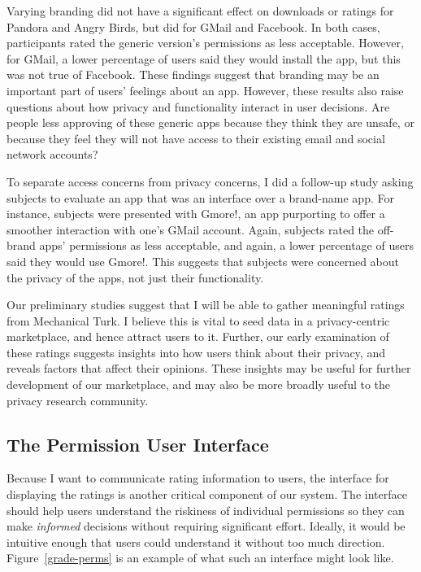 \documentclass[11pt]{article}
\newcommand{\reffig}[1]{Figure~\ref{#1}}
\begin{document}
Varying branding did not have a significant effect on downloads or
ratings for Pandora and Angry Birds, but did 
for GMail and Facebook. In both cases,
participants rated the generic version's permissions as less
acceptable. However, for GMail, a lower percentage of users said they
would install the app, but this was not true of Facebook.  These
findings suggest that branding may be an important part of users'
feelings about an app. However, these results also raise questions
about how privacy and functionality interact in user decisions. Are
people less approving of these generic apps because they think they
are unsafe, or because they feel they will not have access to their
existing email and social network accounts?

To separate access concerns from privacy concerns, I did a follow-up
study asking subjects to evaluate an app that was an
interface over a brand-name app. For instance,
subjects were presented with Gmore!, an app purporting to offer a
smoother interaction with one's GMail account. Again, subjects rated
the off-brand apps' permissions as less acceptable, and again, a lower
percentage of users said they would use Gmore!. This suggests that
subjects were concerned about the privacy of the apps, not just their
functionality.

Our preliminary studies suggest that I will be able to gather
meaningful ratings from Mechanical Turk. I believe this is vital
to seed data in a privacy-centric marketplace, and hence attract users
to it. Further, our early examination of these ratings 
suggests insights into how users think about their privacy, and reveals
factors that affect their opinions. These insights may be useful for
further development of our marketplace, and may also be more broadly
useful to the privacy research community.

\subsection{The Permission User Interface}
\label{subsec-perm-ui}

Because I want to communicate rating information to users,
the interface for displaying the ratings is another critical component of 
our system. The interface should help users understand the 
riskiness of individual permissions so they can make \emph{informed}
decisions without requiring significant
effort. Ideally, it would be 
intuitive enough that users could understand it without too 
much direction. \reffig{grade-perms} is an example of what such an interface
might look like.
\end{document}
